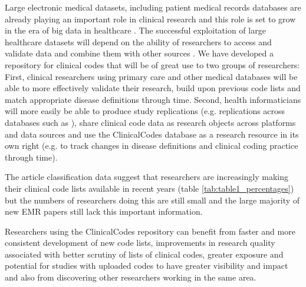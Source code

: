 \documentclass[10pt]{article}
\begin{document}
Large electronic medical datasets, including patient medical records databases are already playing an important role in clinical research and this role is set to grow in the era of big data in healthcare \cite{Wang2013}. The successful exploitation of large healthcare datasets will depend on the ability of researchers to access and validate data and combine them with other sources \cite{Murdoch2013}.  We have developed a repository for clinical codes that will be of great use to two groups of researchers:  First, clinical researchers using primary care and other medical databases will be able to more effectively validate their research, build upon previous code lists and match appropriate disease definitions through time. Second, health informaticians will more easily be able to produce study replications (e.g. replications across databases such as \cite{Reeves2014}), share clinical code data as research objects across platforms and data sources and use the ClinicalCodes database as a research resource in its own right (e.g. to track changes in disease definitions and clinical coding practice through time).

The article classification data suggest that researchers are increasingly making their clinical code lists available in recent years (table \ref{tab:table1_percentages}) but the numbers of researchers doing this are still small and the large majority of new EMR papers still lack this important information.

Researchers using the ClinicalCodes repository can benefit from faster and more consistent development of new code lists, improvements in research quality associated with better scrutiny of lists of clinical codes, greater exposure and potential for studies with uploaded codes to have greater visibility and impact and also from discovering other researchers working in the same area.
\end{document}
